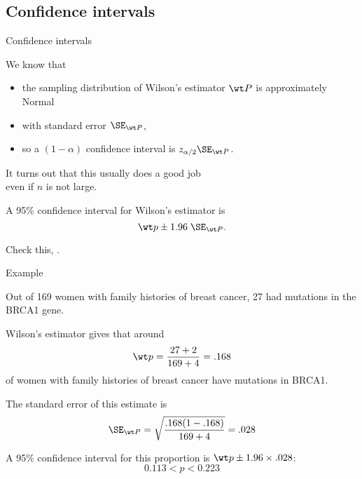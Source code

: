 \subsection{Confidence intervals}

\begin{frame}{Confidence intervals}

    We know that 
    \begin{itemize}
        \item the sampling distribution of Wilson's estimator $\wt P$ is approximately Normal
        \item with standard error $\SE_{\wt P}$,
        \item so a $(1-\alpha)$ confidence interval is $z_{\alpha/2} \SE_{\wt P}$.
    \end{itemize}
    It turns out that this usually does a good job \\
    \alert{even if $n$ is not large.}

    \vspace{2em}

    \begin{block}{A 95\% confidence interval}
        for Wilson's estimator is
        \[ \wt p \pm 1.96 \; \SE_{\wt P} . \]
    \end{block}

    \vspace{2em}

    Check this, .

\end{frame}


\begin{frame}{Example}

    Out of 169 women with family histories of breast cancer, 27 had mutations in the BRCA1 gene.

    \vspace{2em}

    \alert{Wilson's estimator} gives that around
        \[ \wt p = \frac{27 + 2}{169+4} = .168 \]
    of women with family histories of breast cancer have mutations in BRCA1.

    \vspace{2em}

    The \alert{standard error} of this estimate is
    \[ \SE_{\wt P} = \sqrt{\frac{.168(1-.168)}{169+4}} = .028  \]

    \vspace{2em}

    A \alert{95\% confidence interval} for this proportion is $\wt p \pm 1.96 \times .028$:
    \[ 0.113 < p < 0.223 \]

\end{frame}

